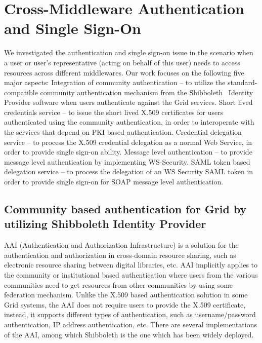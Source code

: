 \documentclass[twocolumn]{svjour3}         %
\begin{document}
\section{Cross-Middleware Authentication and Single Sign-On}
\label{sec:siglesignon}
We investigated the authentication and single sign-on issue in the scenario when a user or user’s representative (acting on behalf of this user) needs to access resources across different middlewares. Our work focuses on the following five major aspects:
Integration of community authentication – to utilize the standard-compatible community authentication mechanism from the Shibboleth~\cite{Shiblink} Identity Provider software when users authenticate against the Grid services.
Short lived credentials service – to issue the short lived X.509 certificates for users authenticated using the community authentication, in order to interoperate with the services that depend on PKI based authentication.
Credential delegation service – to process the X.509 credential delegation as a normal Web Service, in order to provide single sign-on ability.
Message level authentication – to provide message level authentication by implementing WS-Security.
SAML token based delegation service – to process the delegation of an WS Security SAML token in order to provide single sign-on for SOAP message level authentication.


\subsection{Community based authentication for Grid by utilizing Shibboleth Identity Provider}
\label{sec:communityauthn}
AAI (Authentication and Authorization Infrastructure) is a solution for the authentication and authorization in cross-domain resource sharing, such as electronic resource sharing between digital libraries, etc. AAI implicitly applies to the community or institutional based authentication where users from the various communities need to get resources from other communities by using some federation mechanism. Unlike the X.509 based authentication solution in some Grid systems, the AAI does not require users to provide the X.509 certificate, instead, it supports different types of authentication, such as username/password authentication, IP address authentication, etc. There are several implementations of the AAI, among which Shibboleth is the one which has been widely deployed.
\end{document}
